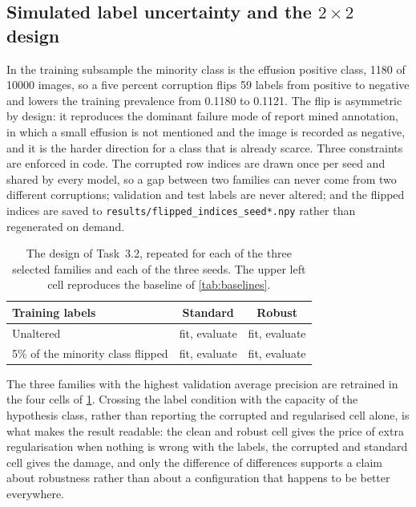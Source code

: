 \subsection{Simulated label uncertainty and the \texorpdfstring{$2\times2$}{2x2} design}
\label{sec:protocol-noise}

In the training subsample the minority class is the effusion positive class,
\num{1180} of \num{10000} images, so a five percent corruption flips \num{59}
labels from positive to negative and lowers the training prevalence from
\num{0.1180} to \num{0.1121}. The flip is asymmetric by design: it reproduces
the dominant failure mode of report mined annotation, in which a small effusion
is not mentioned and the image is recorded as negative, and it is the harder
direction for a class that is already scarce. Three constraints are enforced in
code. The corrupted row indices are drawn once per seed and shared by every
model, so a gap between two families can never come from two different
corruptions; validation and test labels are never altered; and the flipped
indices are saved to \texttt{results/flipped\_indices\_seed*.npy} rather than
regenerated on demand.

\begin{table}[t]
  \centering
  \caption{The design of Task~3.2, repeated for each of the three selected
  families and each of the three seeds. The upper left cell reproduces the
  baseline of \cref{tab:baselines}.}
  \label{tab:design}
  \small
  \begin{tabular}{@{}p{}cc@{}}
    \toprule
    Training labels & Standard & Robust \\
    \midrule
    Unaltered                      & fit, evaluate & fit, evaluate \\[2pt]
    \num{5}\% of the minority
    class flipped                  & fit, evaluate & fit, evaluate \\
    \bottomrule
  \end{tabular}
\end{table}

The three families with the highest validation average precision are retrained
in the four cells of \cref{tab:design}. Crossing the label condition with the
capacity of the hypothesis class, rather than reporting the corrupted and
regularised cell alone, is what makes the result readable: the clean and robust
cell gives the price of extra regularisation when nothing is wrong with the
labels, the corrupted and standard cell gives the damage, and only the
difference of differences supports a claim about robustness rather than about a
configuration that happens to be better everywhere.

